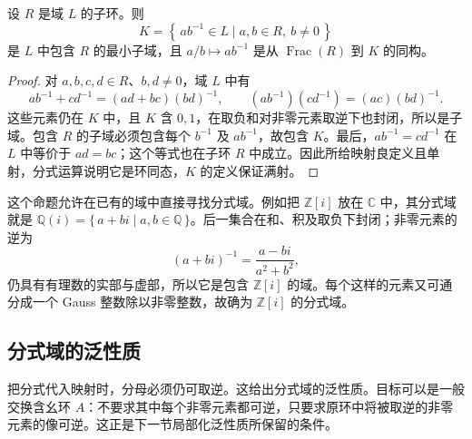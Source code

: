 \begin{proposition}\label{b1:prop:fraction-in-ambient-field}
	设 \(R\) 是域 \(L\) 的子环。则
	\[
		K=\left\{\,ab^{-1}\in L\mid a,b\in R,\ b\neq0\,\right\}
	\]
	是 \(L\) 中包含 \(R\) 的最小子域，且 \(a/b\mapsto ab^{-1}\) 是从 \(\operatorname{Frac}(R)\) 到 \(K\) 的同构。
\end{proposition}
\begin{proof}
	对 \(a,b,c,d\in R\)、\(b,d\neq0\)，域 \(L\) 中有
	\[
		ab^{-1}+cd^{-1}=(ad+bc)(bd)^{-1}, \qquad (ab^{-1})(cd^{-1})=(ac)(bd)^{-1}.
	\]
	这些元素仍在 \(K\) 中，且 \(K\) 含 \(0,1\)，在取负和对非零元素取逆下也封闭，所以是子域。包含 \(R\) 的子域必须包含每个 \(b^{-1}\) 及 \(ab^{-1}\)，故包含 \(K\)。最后，\(ab^{-1}=cd^{-1}\) 在 \(L\) 中等价于 \(ad=bc\)；这个等式也在子环 \(R\) 中成立。因此所给映射良定义且单射，分式运算说明它是环同态，\(K\) 的定义保证满射。
\end{proof}
这个命题允许在已有的域中直接寻找分式域。例如把 \(\mathbb Z[i]\) 放在 \(\mathbb C\) 中，其分式域就是 \(\mathbb Q(i)=\{\,a+bi\mid a,b\in\mathbb Q\,\}\)。后一集合在和、积及取负下封闭；非零元素的逆为
\[
	(a+bi)^{-1}=\frac{a-bi}{a^2+b^2},
\]
仍具有有理数的实部与虚部，所以它是包含 \(\mathbb Z[i]\) 的域。每个这样的元素又可通分成一个 Gauss 整数除以非零整数，故确为 \(\mathbb Z[i]\) 的分式域。

\subsection{分式域的泛性质}
\label{b1:subsec:1301:03}

把分式代入映射时，分母必须仍可取逆。这给出分式域的泛性质。目标可以是一般交换含幺环 \(A\)：不要求其中每个非零元素都可逆，只要求原环中将被取逆的非零元素的像可逆。这正是下一节局部化泛性质所保留的条件。

